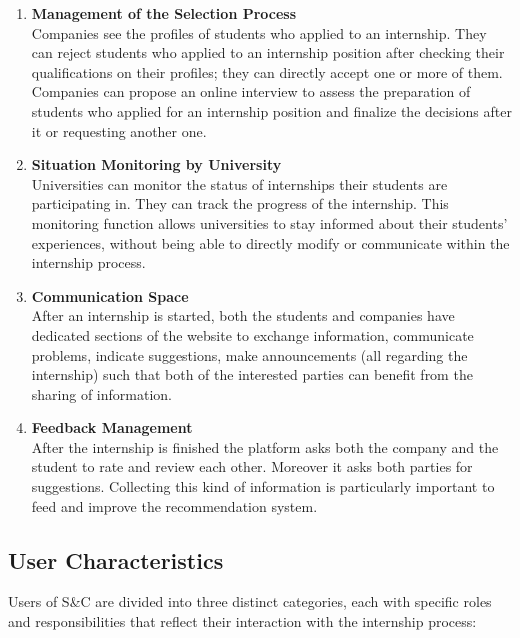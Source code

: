 \begin{enumerate}
        \item \textbf {Management of the Selection Process}
        \\ Companies see the profiles of students who applied to an internship. They can reject students who applied to an internship position after checking their qualifications on their profiles; they can directly accept one or more of them. Companies can propose an online interview to assess the preparation of students who applied for an internship position and finalize the decisions after it or requesting another one.

        \item \textbf{Situation Monitoring by University}
        \\ Universities can monitor the status of internships their students are participating in. They can track the progress of the internship. This monitoring function allows universities to stay informed about their students' experiences, without being able to directly modify or communicate within the internship process.
        
        \item \textbf {Communication Space}
        \\ After an internship is started, both the students and companies have dedicated sections of the website to exchange information, communicate problems, indicate suggestions, make announcements (all regarding the internship) such that both of the interested parties can benefit from the sharing of information. 

        \item \textbf {Feedback Management}
        \\ After the internship is finished the platform asks both the company and the student to rate and review each other. Moreover it asks both parties for suggestions. Collecting this kind of information is particularly important to feed and improve the recommendation system.
        \\
    \end{enumerate}

\subsection{User Characteristics}
    Users of S\&C are divided into three distinct categories, each with specific roles and responsibilities that reflect their interaction with the internship process:
    
